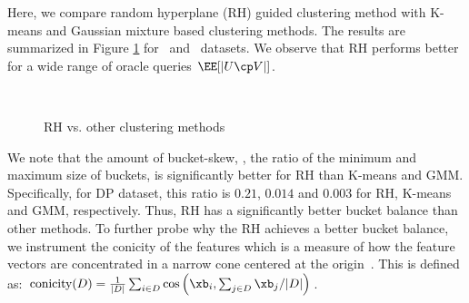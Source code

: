 \documentclass[letterpaper]{article}
\renewcommand{\cite}{\citep}
\begin{document}
%
Here, we compare random hyperplane (RH) guided clustering method with K-means and Gaussian mixture based clustering methods.
The results are summarized in Figure \ref{fig:K-means} for \dpr\ and \cifar\ datasets.  We observe that RH performs better for a wide range of oracle queries $\EE[|U\cp V|]$.
\begin{figure}[h!]
    \centering
 \\[-0.1ex]
 \hspace{3mm}
\hspace{0.5mm}
\caption{\small RH vs. other clustering methods}
\label{fig:K-means}
\end{figure}
We note that the amount of bucket-skew, \ie, the ratio of the minimum and maximum size of buckets, is significantly better  for RH than K-means and GMM.  Specifically, for DP dataset, this ratio is $0.21$, $0.014$ and $0.003$ for RH, K-means and GMM, respectively. Thus, RH has a significantly better bucket balance than other methods. 
To further probe why the RH achieves a better bucket balance, we instrument the conicity of the features which is a measure of how the feature vectors are concentrated in a narrow cone centered at the origin~\cite{sharma2018towards}. This is defined as: 
$    \text{conicity}(D) = \frac{1}{|D|}\sum_{i\in D}\cos\left(\xb_i, {\sum_{j\in D} \xb_j}/{|D|} \right)$.
%
\end{document}
